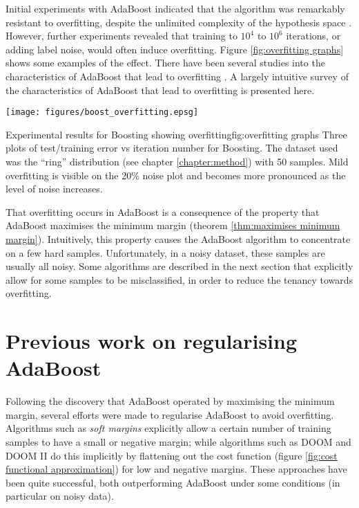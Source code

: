 Initial experiments with AdaBoost indicated that the algorithm was
remarkably resistant to overfitting, despite the unlimited complexity
of the hypothesis space \cite{Freund96}.
However, further experiments \cite{Grove98, Bauer99} revealed that
training to $10^4$ to $10^6$ iterations, or adding label noise, would
often induce overfitting.  Figure \ref{fig:overfitting graphs} shows some
examples of the effect.  There have been several studies into the
characteristics of AdaBoost that lead to overfitting \cite{Schapire97,
Grove98, Ratsch98}.  A largely intuitive survey of the characteristics
of AdaBoost that lead to overfitting is presented here. 

\begin{linefigure}
\begin{center}
\texttt{[image: figures/boost\_overfitting.epsg]}
\end{center}
\begin{capt}{Experimental results for Boosting showing
overfitting}{fig:overfitting graphs}
Three plots of test/training error vs iteration number for Boosting.
The dataset used was the ``ring'' distribution (see chapter
\ref{chapter:method}) with 50 samples.  Mild overfitting is visible on
the 20\% noise plot and becomes more pronounced as the level of noise
increases.
\end{capt}
\end{linefigure}

That overfitting occurs in AdaBoost is a consequence of the property
that AdaBoost maximises the minimum margin (theorem
\ref{thm:maximises minimum margin}).  Intuitively, this property
causes the  AdaBoost algorithm to concentrate on a few hard
samples.  Unfortunately, in a noisy dataset, these samples are usually
all noisy.  Some algorithms are described in the next section that
explicitly allow for some samples to be misclassified, in order to
reduce the tenancy towards overfitting.

\section{Previous work on regularising AdaBoost}

Following the discovery that AdaBoost operated by maximising the
minimum margin, several efforts were made to regularise AdaBoost to
avoid overfitting.  Algorithms such as \emph{soft margins}
\cite{Ratsch98} explicitly allow a certain number of training samples
to have a small or negative margin; while algorithms such as DOOM and
DOOM II \cite{Mason99a, Mason99b} do this implicitly by flattening out
the cost function (figure \ref{fig:cost functional approximation}) for
low and negative margins.  These approaches have been quite
successful, both outperforming AdaBoost under some conditions (in
particular on noisy data).


